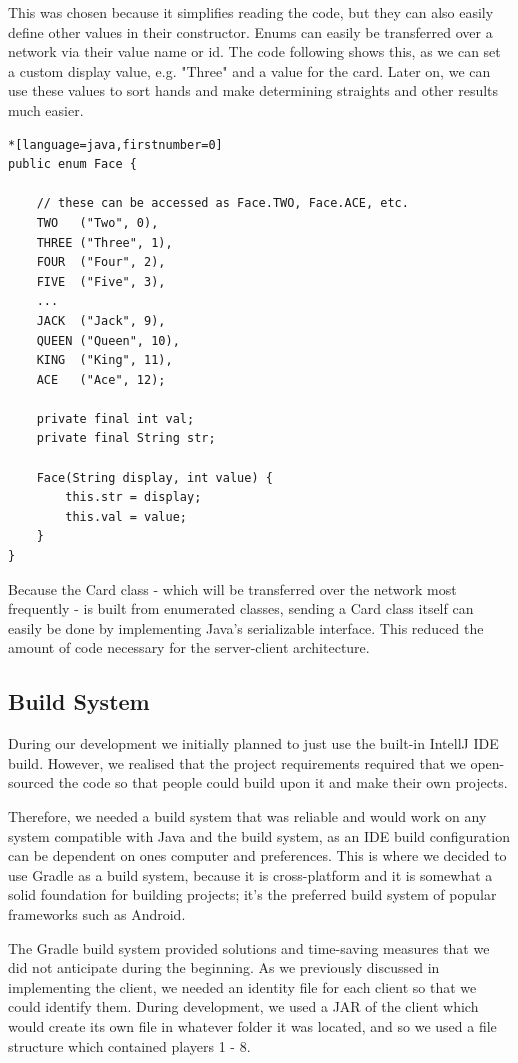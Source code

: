 \documentclass[11pt]{article}
\begin{document}
This was chosen because it simplifies reading the code, but they can also easily define other values in their constructor. Enums can easily be transferred over a network via their value name or id. The code following shows this, as we can set a custom display value, e.g. "Three" and a value for the card. Later on, we can use these values to sort hands and make determining straights and other results much easier. 

\begin{lstlisting}*[language=java,firstnumber=0]
public enum Face {

	// these can be accessed as Face.TWO, Face.ACE, etc. 
    TWO   ("Two", 0),
    THREE ("Three", 1),
    FOUR  ("Four", 2),
    FIVE  ("Five", 3),
	...
    JACK  ("Jack", 9),
    QUEEN ("Queen", 10),
    KING  ("King", 11),
    ACE   ("Ace", 12);

    private final int val;
    private final String str;

    Face(String display, int value) {
        this.str = display;
        this.val = value;
    }
}
\end{lstlisting}


Because the Card class - which will be transferred over the network most frequently - is built from enumerated classes, sending a Card class itself can easily be done by implementing Java's serializable interface. This reduced the amount of code necessary for the server-client architecture.

\newpage

\subsection{Build System}
During our development we initially planned to just use the built-in IntellJ IDE build. However, we realised that the project requirements required that we open-sourced the code so that people could build upon it and make their own projects. 

Therefore, we needed a build system that was reliable and would work on any system compatible with Java and the build system, as an IDE build configuration can be dependent on ones computer and preferences. This is where we decided to use Gradle as a build system, because it is cross-platform and it is somewhat a solid foundation for building projects; it's the preferred build system of popular frameworks such as Android. %

The Gradle build system provided solutions and time-saving measures that we did not anticipate during the beginning. As we previously discussed in implementing the client, we needed an identity file for each client so that we could identify them. During development, we used a JAR of the client which would create its own file in whatever folder it was located, and so we used a file structure which contained players 1 - 8. \\
\end{document}
